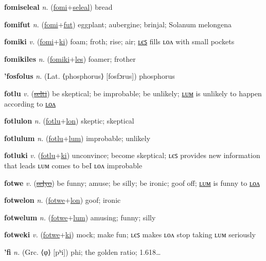 \textbf{\hypertarget{fomiseleal}{fomiseleal}} \textit{n.} (\hyperlink{fomi}{fomi}+\allowbreak \hyperlink{seleal}{seleal})
bread

\textbf{\hypertarget{fomifut}{fomifut}} \textit{n.} (\hyperlink{fomi}{fomi}+\allowbreak \hyperlink{fut}{fut})
eggplant; aubergine; brinjal; Solanum melongena

\textbf{\hypertarget{fomiki}{fomiki}} \textit{v.} (\hyperlink{fomi}{fomi}+\allowbreak \hyperlink{ki}{ki})
foam; froth; rise; air; \hyperlink{fomikiles}{ʟєꜱ} fills ʟᴏᴧ with small pockets

\textbf{\hypertarget{fomikiles}{fomikiles}} \textit{n.} (\hyperlink{fomiki}{fomiki}+\allowbreak \hyperlink{les}{les})
foamer; frother

\textbf{\hypertarget{'fosfolus}{'fosfolus}} \textit{n.} (Lat. ⟨phosphorus⟩ [fosfɔrus])
phosphorus

\textbf{\hypertarget{fotlu}{fotlu}} \textit{v.} (\hyperlink{selti}{\sout{selti}})
be skeptical; be improbable; be unlikely; \hyperlink{fotlulum}{ʟᴜᴍ} is unlikely to happen according to \hyperlink{fotlulon}{ʟᴏᴧ}

\textbf{\hypertarget{fotlulon}{fotlulon}} \textit{n.} (\hyperlink{fotlu}{fotlu}+\allowbreak \hyperlink{lon}{lon})
skeptic; skeptical

\textbf{\hypertarget{fotlulum}{fotlulum}} \textit{n.} (\hyperlink{fotlu}{fotlu}+\allowbreak \hyperlink{lum}{lum})
improbable; unlikely

\textbf{\hypertarget{fotluki}{fotluki}} \textit{v.} (\hyperlink{fotlu}{fotlu}+\allowbreak \hyperlink{ki}{ki})
unconvince; become skeptical; ʟєꜱ provides new information that leads ʟᴜᴍ comes to beI ʟᴏᴧ improbable

\textbf{\hypertarget{fotwe}{fotwe}} \textit{v.} (\hyperlink{selyo}{\sout{selyo}})
be funny; amuse; be silly; be ironic; goof off; \hyperlink{fotwelum}{ʟᴜᴍ} is funny to \hyperlink{fotwelon}{ʟᴏᴧ}

\textbf{\hypertarget{fotwelon}{fotwelon}} \textit{n.} (\hyperlink{fotwe}{fotwe}+\allowbreak \hyperlink{lon}{lon})
goof; ironic

\textbf{\hypertarget{fotwelum}{fotwelum}} \textit{n.} (\hyperlink{fotwe}{fotwe}+\allowbreak \hyperlink{lum}{lum})
amusing; funny; silly

\textbf{\hypertarget{fotweki}{fotweki}} \textit{v.} (\hyperlink{fotwe}{fotwe}+\allowbreak \hyperlink{ki}{ki})
mock; make fun; ʟєꜱ makes ʟᴏᴧ stop taking ʟᴜᴍ seriously

\textbf{\hypertarget{'fi}{'fi}} \textit{n.} (Grc. ⟨φ⟩ [pʰi])
phi; the golden ratio; 1.618…

